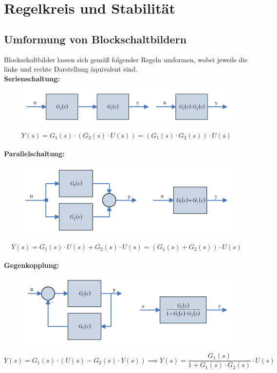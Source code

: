 \documentclass[10pt,a4paper]{article}
\begin{document}
\section{Regelkreis und Stabilität}
\subsection{Umformung von Blockschaltbildern}
Blockschaltbilder lassen sich gemäß folgender Regeln umformen, wobei jeweils die linke und rechte Darstellung äquivalent sind. \\

\textbf{Serienschaltung:}
\begin{figure}[H]
	\includegraphics[width = \columnwidth]{imgs/serienschaltung.png}
\end{figure}
$$
	Y(s) = G_1(s) ⋅ (G_2(s) ⋅ U(s)) = (G_1(s) ⋅ G_2(s)) ⋅ U(s)
$$ \\

\textbf{Parallelschaltung:}
\begin{figure}[H]
	\includegraphics[width = \columnwidth]{imgs/parallelschaltung.png}
\end{figure}
$$
	Y(s) = G_1(s) ⋅ U(s) + G_2(s) ⋅ U(s) = (G_1(s) + G_2(s)) ⋅ U(s)
$$ \\

\textbf{Gegenkopplung:}
\begin{figure}[H]
	\includegraphics[width = \columnwidth]{imgs/gegenkopplung.png}
\end{figure}
$$
	Y(s) = G_1(s) ⋅ (U(s) - G_2(s) ⋅ Y(s)) \implies Y(s) = \frac{G_1(s)}{1 + G_1(s) ⋅ G_2(s)} ⋅ U(s)
$$ \\
\end{document}
